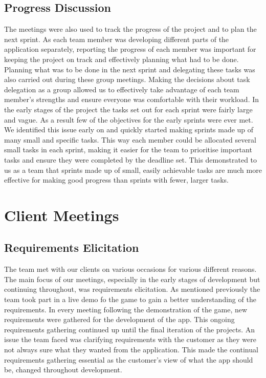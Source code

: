\documentclass{l3proj}
\begin{document}
\subsection{Progress Discussion}
The meetings were also used to track the progress of the project and to plan the next sprint. As each team member was developing different parts of the application separately, reporting the progress of each member was important for keeping the project on track and effectively planning what had to be done. Planning what was to be done in the next sprint and delegating these tasks was also carried out during these group meetings. Making the decisions about task delegation as a group allowed us to effectively take advantage of each team member’s strengths and ensure everyone was comfortable with their workload. In the early stages of the project the tasks set out for each sprint were fairly large and vague. As a result few of the objectives for the early sprints were ever met. We identified this issue early on and quickly started making sprints made up of many small and specific tasks. This way each member could be allocated several small tasks in each sprint, making it easier for the team to prioritise important tasks and ensure they were completed by the deadline set. This demonstrated to us as a team that sprints made up of small, easily achievable tasks are much more effective for making good progress than sprints with fewer, larger tasks.

\section{Client Meetings}
\label{sec:clientmeeting}
\subsection{Requirements Elicitation}
The team met with our clients on various occasions for various different reasons. The main focus of our meetings, especially in the early stages of development but continuing throughout, was requirements elicitation. As mentioned previously the team took part in a live demo fo the game to gain a better understanding of the requirements. In every meeting following the demonstration of the game, new requirements were gathered for the development of the app. This ongoing requirements gathering continued up until the final iteration of the projects. An issue the team faced was clarifying requirements with the customer as they were not always sure what they wanted from the application. This made the continual requirements gathering essential as the customer’s view of what the app should be, changed throughout development.
\end{document}
